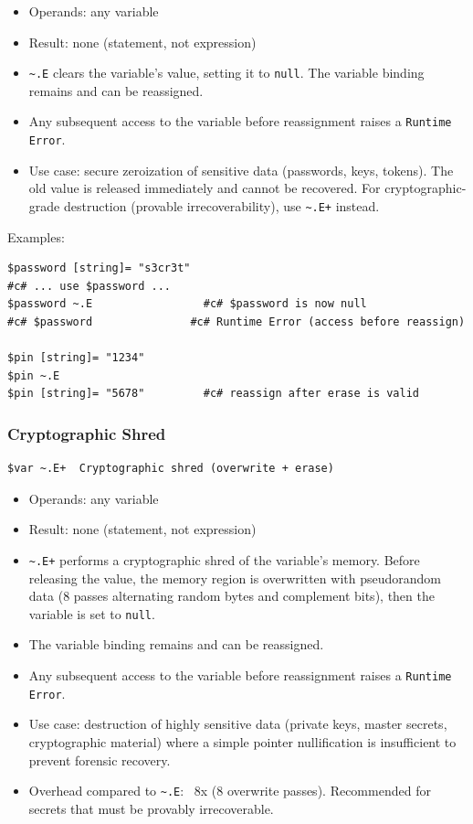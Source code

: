 \begin{itemize}
\item Operands: any variable
\item Result: none (statement, not expression)
\item \texttt{\textasciitilde.E} clears the variable's value, setting it to \texttt{null}. The variable binding remains and can be reassigned.
\item Any subsequent access to the variable before reassignment raises a \texttt{Runtime Error}.
\item Use case: secure zeroization of sensitive data (passwords, keys, tokens). The old value is released immediately and cannot be recovered. For cryptographic-grade destruction (provable irrecoverability), use \texttt{\textasciitilde.E+} instead.
\end{itemize}

Examples:
\begin{verbatim}
$password [string]= "s3cr3t"
#c# ... use $password ...
$password ~.E                 #c# $password is now null
#c# $password               #c# Runtime Error (access before reassign)

$pin [string]= "1234"
$pin ~.E
$pin [string]= "5678"         #c# reassign after erase is valid
\end{verbatim}

\subsubsection{Cryptographic Shred}
\begin{verbatim}
$var ~.E+  Cryptographic shred (overwrite + erase)
\end{verbatim}

\begin{itemize}
\item Operands: any variable
\item Result: none (statement, not expression)
\item \texttt{\textasciitilde.E+} performs a cryptographic shred of the variable's memory. Before releasing the value, the memory region is overwritten with pseudorandom data (8 passes alternating random bytes and complement bits), then the variable is set to \texttt{null}.
\item The variable binding remains and can be reassigned.
\item Any subsequent access to the variable before reassignment raises a \texttt{Runtime Error}.
\item Use case: destruction of highly sensitive data (private keys, master secrets, cryptographic material) where a simple pointer nullification is insufficient to prevent forensic recovery.
\item Overhead compared to \texttt{\textasciitilde.E}: ~8x (8 overwrite passes). Recommended for secrets that must be provably irrecoverable.
\end{itemize}

